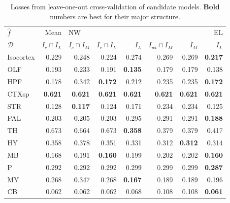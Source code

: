 \begin{table}
\begin{tabular}{lrrrrrrr}
\toprule
$\widehat f$ &           Mean & \multicolumn{5}{l}{NW} &     EL \\
$\mathcal D$ & $I_c \cap I_L$ & $I_c \cap I_M$ & $I_c \cap I_L$ &  $I_L$ & $I_{wt} \cap I_M$ &  $I_M$ &  $I_L$ \\
\midrule
Isocortex &          0.229 &          0.248 &          0.224 &  0.274 &             0.269 &  0.269 &  \textbf{0.217} \\
OLF       &          0.193 &          0.233 &          0.191 &   \textbf{0.135} &             0.179 &  0.179 &  0.138 \\
HPF       &          0.178 &          0.342 &          \textbf{ 0.172 }&  0.212 &             0.235 &  0.235 &   \textbf{0.172} \\
CTXsp     &          \textbf{ 0.621 }&      \textbf{     0.621 }&       \textbf{    0.621} &   \textbf{0.621 }&            \textbf{  0.621} &   \textbf{0.621 }&   \textbf{0.621 }\\
STR       &          0.128 &         \textbf{  0.117} &          0.124 &  0.171 &             0.234 &  0.234 &  0.125 \\
PAL       &          0.203 &          0.205 &          0.203 &  0.295 &             0.291 &  0.291 & \textbf{  0.188 }\\
TH        &          0.673 &          0.664 &          0.673 &   \textbf{0.358} &             0.379 &  0.379 &  0.417 \\
HY        &          0.358 &          0.378 &          0.351 &  0.331 &             0.312 &   \textbf{0.312} &  0.314 \\
MB        &          0.168 &          0.191 &         \textbf{ 0.160 }&  0.199 &             0.202 &  0.202 & \textbf{ 0.160} \\
P         &          0.292 &          0.292 &          0.292 &  0.299 &             0.299 &  0.299 &\textbf{  0.287 }\\
MY        &          0.268 &          0.347 &          0.268 &  \textbf{0.167} &             0.189 &  0.189 &  0.196 \\
CB        &          0.062 &          0.062 &          0.062 &  0.068 &             0.108 &  0.108 &  \textbf{0.061 }\\
\bottomrule
\end{tabular}
\caption{Losses from leave-one-out cross-validation of candidate models. \textbf{Bold} numbers are best for their major structure.}
\label{tab:crossvalidation}
\end{table}

